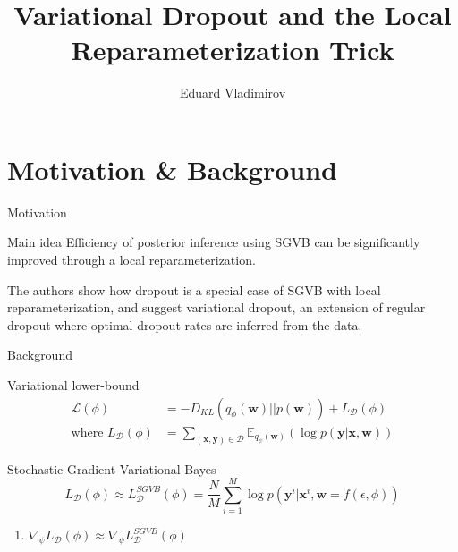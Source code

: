 \documentclass{beamer}
\title{Variational Dropout and the Local Reparameterization Trick}
\author{Eduard Vladimirov}
\institute{MIPT, 2023}
\newcommand{\bx}{\mathbf{x}}
\newcommand{\by}{\mathbf{y}}
\newcommand{\bw}{\mathbf{w}}
\begin{document}
\begin{frame}
    \titlepage
\end{frame}


\begin{frame}
    \tableofcontents
\end{frame}


\section{Motivation \& Background}
\begin{frame}{Motivation}
    \begin{block}{Main idea}
    Efficiency of posterior inference using SGVB can be significantly improved through a local reparameterization.
    
    The authors show how dropout is a special case of SGVB with
    local reparameterization, and suggest variational dropout, an extension of regular
    dropout where optimal dropout rates are inferred from the data.
    \end{block} 
\end{frame}


\begin{frame}{Background}
	\begin{block}{Variational lower-bound}
		\begin{align*}
			\mathcal{L}(\phi) &= -D_{KL}(q_\phi(\bw) || p(\bw)) + L_\mathcal{D}(\phi) \\
			\text{where } L_\mathcal{D}(\phi) &= \sum\limits_{(\bx, \by) \in \mathcal{D}} \mathbb{E}_{q_\psi(\bw)}(\log p(\by | \bx, \bw))
		\end{align*}
	\end{block}
    
    \begin{block}{Stochastic Gradient Variational Bayes}
    \begin{equation*}
        L_\mathcal{D}(\phi) \approx L_\mathcal{D}^{SGVB}(\phi) = \dfrac{N}{M} \sum\limits_{i=1}^M \log p(\by^i | \bx^i, \bw = f(\epsilon, \phi))
    \end{equation*} 

    \begin{enumerate}
	    \item $\nabla_\psi L_\mathcal{D}(\phi) \approx \nabla_\psi L_\mathcal{D}^{SGVB}(\phi)$
    \end{enumerate}
        
    \end{block}
\end{frame}
\end{document}
